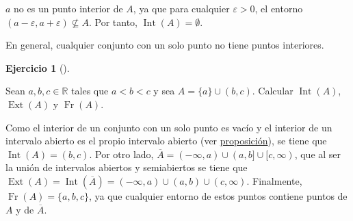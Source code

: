 \documentclass[
  spanish,
  a4paper,
]{scrreport}
\theoremstyle{definition}
\newtheorem{exercise}{Ejercicio}[chapter]
\theoremstyle{remark}
\begin{document}
\begin{tcolorbox}[enhanced jigsaw, arc=.35mm, bottomrule=.15mm, bottomtitle=1mm, breakable, colback=white, colbacktitle=quarto-callout-tip-color!10!white, colframe=quarto-callout-tip-color-frame, coltitle=black, left=2mm, leftrule=.75mm, opacityback=0, opacitybacktitle=0.6, rightrule=.15mm, title=\textcolor{quarto-callout-tip-color}{\faLightbulb}\hspace{0.5em}{Solución}, titlerule=0mm, toprule=.15mm, toptitle=1mm]

\(a\) no es un punto interior de \(A\), ya que para cualquier
\(\varepsilon>0\), el entorno
\((a-\varepsilon, a+\varepsilon)\not\subseteq A\). Por tanto,
\(\operatorname{Int}(A)=\emptyset\).

En general, cualquier conjunto con un solo punto no tiene puntos
interiores.

\end{tcolorbox}

\begin{exercise}[]\protect\hypertarget{exr-interior-exterior-frontera}{}\label{exr-interior-exterior-frontera}

Sean \(a,b,c\in\mathbb{R}\) tales que \(a<b<c\) y sea
\(A=\{a\}\cup (b,c)\). Calcular \(\operatorname{Int}(A)\),
\(\operatorname{Ext}(A)\) y \(\operatorname{Fr}(A)\).

\end{exercise}

\begin{tcolorbox}[enhanced jigsaw, arc=.35mm, bottomrule=.15mm, bottomtitle=1mm, breakable, colback=white, colbacktitle=quarto-callout-tip-color!10!white, colframe=quarto-callout-tip-color-frame, coltitle=black, left=2mm, leftrule=.75mm, opacityback=0, opacitybacktitle=0.6, rightrule=.15mm, title=\textcolor{quarto-callout-tip-color}{\faLightbulb}\hspace{0.5em}{Solución}, titlerule=0mm, toprule=.15mm, toptitle=1mm]

Como el interior de un conjunto con un solo punto es vacío y el interior
de un intervalo abierto es el propio intervalo abierto (ver
\href{https://aprendeconalf.es/analisis-manual/03-topologia-reales.html\#prp-interior-intervalo-abierto}{proposición}),
se tiene que \(\operatorname{Int}(A)=(b,c)\). Por otro lado,
\(\overline{A}=(-\infty,a)\cup (a,b]\cup [c,\infty)\), que al ser la
unión de intervalos abiertos y semiabiertos se tiene que
\(\operatorname{Ext}(A)=\operatorname{Int}(\overline{A})=(-\infty,a)\cup (a,b)\cup (c,\infty)\).
Finalmente, \(\operatorname{Fr}(A)=\{a,b,c\}\), ya que cualquier entorno
de estos puntos contiene puntos de \(A\) y de \(\overline{A}\).

\end{tcolorbox}
\end{document}
